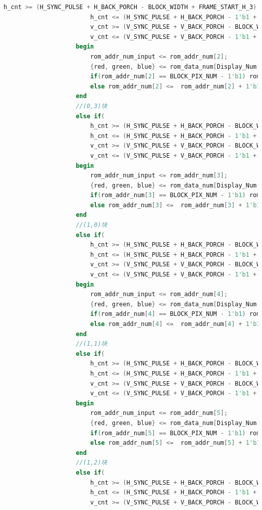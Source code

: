 \documentclass[UTF8]{article}
\begin{document}
\begin{lstlisting}[language=Verilog]
						h_cnt >= (H_SYNC_PULSE + H_BACK_PORCH - BLOCK_WIDTH + FRAME_START_H_3) &&
						h_cnt <= (H_SYNC_PULSE + H_BACK_PORCH - 1'b1 + FRAME_START_H_3)  && 
						v_cnt >= (V_SYNC_PULSE + V_BACK_PORCH - BLOCK_WIDTH + FRAME_START_V_1) &&
						v_cnt <= (V_SYNC_PULSE + V_BACK_PORCH - 1'b1 + FRAME_START_V_1))
					begin
						rom_addr_num_input <= rom_addr_num[2];
						{red, green, blue} <= rom_data_num[Display_Num[11:8]];
						if(rom_addr_num[2] == BLOCK_PIX_NUM - 1'b1) rom_addr_num[2] <=  13'd0;
						else rom_addr_num[2] <=  rom_addr_num[2] + 1'b1;
					end
					//(0,3)块
					else if(
						h_cnt >= (H_SYNC_PULSE + H_BACK_PORCH - BLOCK_WIDTH + FRAME_START_H_4) &&
						h_cnt <= (H_SYNC_PULSE + H_BACK_PORCH - 1'b1 + FRAME_START_H_4)  && 
						v_cnt >= (V_SYNC_PULSE + V_BACK_PORCH - BLOCK_WIDTH + FRAME_START_V_1) &&
						v_cnt <= (V_SYNC_PULSE + V_BACK_PORCH - 1'b1 + FRAME_START_V_1))
					begin
						rom_addr_num_input <= rom_addr_num[3];
						{red, green, blue} <= rom_data_num[Display_Num[15:12]];
						if(rom_addr_num[3] == BLOCK_PIX_NUM - 1'b1) rom_addr_num[3] <=  13'd0;
						else rom_addr_num[3] <=  rom_addr_num[3] + 1'b1;
					end
					//(1,0)块
					else if(
						h_cnt >= (H_SYNC_PULSE + H_BACK_PORCH - BLOCK_WIDTH + FRAME_START_H_1) &&
						h_cnt <= (H_SYNC_PULSE + H_BACK_PORCH - 1'b1 + FRAME_START_H_1) && 
						v_cnt >= (V_SYNC_PULSE + V_BACK_PORCH - BLOCK_WIDTH + FRAME_START_V_2) &&
						v_cnt <= (V_SYNC_PULSE + V_BACK_PORCH - 1'b1 + FRAME_START_V_2))
					begin
						rom_addr_num_input <= rom_addr_num[4];
						{red, green, blue} <= rom_data_num[Display_Num[19:16]];
						if(rom_addr_num[4] == BLOCK_PIX_NUM - 1'b1) rom_addr_num[4] <=  13'd0;
						else rom_addr_num[4] <=  rom_addr_num[4] + 1'b1;
					end
					//(1,1)块
					else if(
						h_cnt >= (H_SYNC_PULSE + H_BACK_PORCH - BLOCK_WIDTH + FRAME_START_H_2) &&
						h_cnt <= (H_SYNC_PULSE + H_BACK_PORCH - 1'b1 + FRAME_START_H_2)  && 
						v_cnt >= (V_SYNC_PULSE + V_BACK_PORCH - BLOCK_WIDTH + FRAME_START_V_2) &&
						v_cnt <= (V_SYNC_PULSE + V_BACK_PORCH - 1'b1 + FRAME_START_V_2))
					begin
						rom_addr_num_input <= rom_addr_num[5];
						{red, green, blue} <= rom_data_num[Display_Num[23:20]];
						if(rom_addr_num[5] == BLOCK_PIX_NUM - 1'b1) rom_addr_num[5] <=  13'd0;
						else rom_addr_num[5] <=  rom_addr_num[5] + 1'b1;
					end
					//(1,2)块
					else if(
						h_cnt >= (H_SYNC_PULSE + H_BACK_PORCH - BLOCK_WIDTH + FRAME_START_H_3) &&
						h_cnt <= (H_SYNC_PULSE + H_BACK_PORCH - 1'b1 + FRAME_START_H_3)  && 
						v_cnt >= (V_SYNC_PULSE + V_BACK_PORCH - BLOCK_WIDTH + FRAME_START_V_2) &&

\end{lstlisting}
\end{document}
